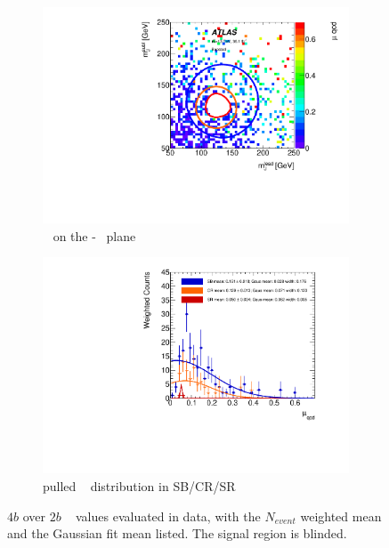 \begin{figure}[htb!]
\centering
\captionsetup{justification=centering}
	\hspace{-1cm}
    \begin{subfigure}[b]{0.4\textwidth}
        \includegraphics[width=\textwidth,angle=-90]{figures/boosted/AppendixMuqcdstudy/FourTag_Incl_mH0H1.pdf}
        \caption{\muqcd~ on the \mleadJ-\msublJ~ plane}
        \label{fig:app-muqcd-4b-2d}
    \end{subfigure}
    \quad \quad \quad \quad 
    \begin{subfigure}[b]{0.4\textwidth}
        \includegraphics[width=\textwidth,angle=-90]{figures/boosted/AppendixMuqcdstudy/FourTag_Incl_mH0H1_pull.pdf}
        \caption{pulled \muqcd~ distribution in SB/CR/SR}
        \label{fig:app-muqcd-4b-pull}
    \end{subfigure}
\caption{$4b$ over $2b$ \muqcd~ values evaluated in data, with the $N_{event}$ weighted mean and the Gaussian fit mean listed. The signal region is blinded.}
\label{fig:app-muqcd-4b}
\end{figure}

